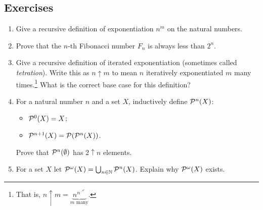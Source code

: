 \documentclass[10pt]{amsart}
\begin{document}

\subsection*{Exercises}

\begin{enumerate}
\item Give a recursive definition of exponentiation $n^m$ on the natural numbers.
\item Prove that the $n$-th Fibonacci number $F_n$ is always less than $2^n$.
\item Give a recursive definition of iterated exponentiation (sometimes called \emph{tetration}). Write this as $n \uparrow m$ to mean $n$ iteratively exponentiated $m$ many times.\footnote{That is,
$ \displaystyle
n \uparrow m = \underbrace{n^{n^{\iddots^{n^n}}}}_{m \text{ many}}.
$}
What is the correct base case for this definition?
\item For a natural number $n$ and a set $X$, inductively define $\mathcal{P}^n(X)$:
  \begin{itemize}
  \item $\mathcal{P}^0(X) = X$;
  \item $\mathcal{P}^{n+1}(X) = \mathcal{P}(\mathcal{P}^n(X))$.
  \end{itemize}
Prove that $\mathcal{P}^n(\emptyset)$ has $2 \uparrow n$ elements.
\item For a set $X$ let $\mathcal{P}^{\omega}(X) = \bigcup_{n \in \mathbb{N}} \mathcal{P}^n(X)$. Explain why $\mathcal{P}^\omega(X)$ exists. 
\end{enumerate}
\end{document}

